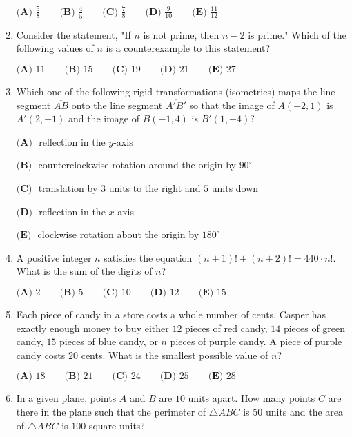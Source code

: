 \documentclass{article}
\begin{document}
\begin{enumerate}[label=\arabic*., itemsep=0.5em]
$\textbf{(A) } \frac{5}{8} \qquad \textbf{(B) } \frac{4}{5} \qquad \textbf{(C) } \frac{7}{8} \qquad \textbf{(D) } \frac{9}{10} \qquad \textbf{(E) } \frac{11}{12}$\par \vspace{0.5em}\item Consider the statement, "If $n$ is not prime, then $n-2$ is prime." Which of the following values of $n$ is a counterexample to this statement?

$\textbf{(A) } 11 \qquad \textbf{(B) } 15 \qquad \textbf{(C) } 19 \qquad \textbf{(D) } 21 \qquad \textbf{(E) } 27$\par \vspace{0.5em}\item Which one of the following rigid transformations (isometries) maps the line segment $\overline{AB}$ onto the line segment $\overline{A'B'}$ so that the image of $A(-2,1)$ is $A'(2,-1)$ and the image of $B(-1,4)$ is $B'(1,-4)?$

$\textbf{(A) } $ reflection in the $y$-axis

$\textbf{(B) } $ counterclockwise rotation around the origin by $90^{\circ}$

$\textbf{(C) } $ translation by $3$ units to the right and $5$ units down

$\textbf{(D) } $ reflection in the $x$-axis

$\textbf{(E) } $ clockwise rotation about the origin by $180^{\circ}$\par \vspace{0.5em}\item A positive integer $n$ satisfies the equation $(n+1)!+(n+2)!=440\cdot n!$. What is the sum of the digits of $n$?

$\textbf{(A) } 2 \qquad \textbf{(B) } 5 \qquad \textbf{(C) } 10\qquad \textbf{(D) } 12 \qquad \textbf{(E) } 15$\par \vspace{0.5em}\item Each piece of candy in a store costs a whole number of cents. Casper has exactly enough money to buy either $12$ pieces of red candy, $14$ pieces of green candy, $15$ pieces of blue candy, or $n$ pieces of purple candy. A piece of purple candy costs $20$ cents. What is the smallest possible value of $n$?

$\textbf{(A) } 18 \qquad \textbf{(B) } 21 \qquad \textbf{(C) } 24\qquad \textbf{(D) } 25 \qquad \textbf{(E) } 28$\par \vspace{0.5em}\item In a given plane, points $A$ and $B$ are $10$ units apart. How many points $C$ are there in the plane such that the perimeter of $\triangle ABC$ is $50$ units and the area of $\triangle ABC$ is $100$ square units?


\end{enumerate}
\end{document}
